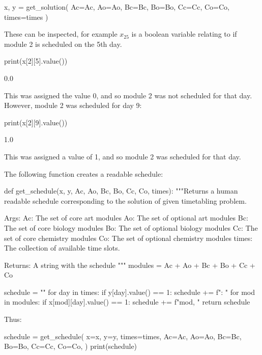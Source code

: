 \begin{pyin}
x, y = get_solution(
    Ac=Ac, Ao=Ao, Bc=Bc, Bo=Bo, Cc=Cc, Co=Co, times=times
)
\end{pyin}

These can be
inspected, for example \(x_{25}\) is a boolean variable relating to if module 2
is scheduled on the 5th day.

\begin{pyin}
print(x[2][5].value())
\end{pyin}

\begin{pyout}
0.0
\end{pyout}

This was assigned the value 0, and so module 2 was not scheduled for that day.
However, module 2 was scheduled for day 9:

\begin{pyin}
print(x[2][9].value())
\end{pyin}

\begin{pyout}
1.0
\end{pyout}

This was assigned a value of 1, and so module 2 was scheduled for that day.

The following function creates a readable schedule:

\begin{pyin}
def get_schedule(x, y, Ac, Ao, Bc, Bo, Cc, Co, times):
    """Returns a human readable schedule corresponding to the
    solution of given timetabling problem.

    Args:
        Ac: The set of core art modules
        Ao: The set of optional art modules
        Bc: The set of core biology modules
        Bo: The set of optional biology modules
        Cc: The set of core chemistry modules
        Co: The set of optional chemistry modules
        times: The collection of available time slots.

    Returns:
        A string with the schedule
    """
    modules = Ac + Ao + Bc + Bo + Cc + Co

    schedule = ""
    for day in times:
        if y[day].value() == 1:
            schedule += f": "
            for mod in modules:
                if x[mod][day].value() == 1:
                    schedule += f"{mod}, "
    return schedule
\end{pyin}

Thus:

\begin{pyin}
schedule = get_schedule(
    x=x,
    y=y,
    times=times,
    Ac=Ac,
    Ao=Ao,
    Bc=Bc,
    Bo=Bo,
    Cc=Cc,
    Co=Co,
)
print(schedule)
\end{pyin}

